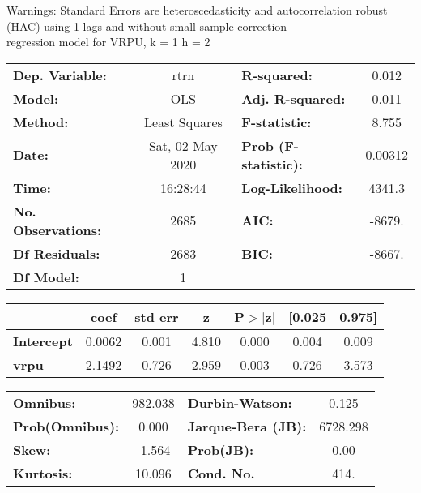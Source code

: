 Warnings: \newline
 [1] Standard Errors are heteroscedasticity and autocorrelation robust (HAC) using 1 lags and without small sample correction\\ 

regression model for VRPU, k = 1 h = 2\begin{center}
\begin{tabular}{lclc}
\toprule
\textbf{Dep. Variable:}    &       rtrn       & \textbf{  R-squared:         } &     0.012   \\
\textbf{Model:}            &       OLS        & \textbf{  Adj. R-squared:    } &     0.011   \\
\textbf{Method:}           &  Least Squares   & \textbf{  F-statistic:       } &     8.755   \\
\textbf{Date:}             & Sat, 02 May 2020 & \textbf{  Prob (F-statistic):} &  0.00312    \\
\textbf{Time:}             &     16:28:44     & \textbf{  Log-Likelihood:    } &    4341.3   \\
\textbf{No. Observations:} &        2685      & \textbf{  AIC:               } &    -8679.   \\
\textbf{Df Residuals:}     &        2683      & \textbf{  BIC:               } &    -8667.   \\
\textbf{Df Model:}         &           1      & \textbf{                     } &             \\
\bottomrule
\end{tabular}
\begin{tabular}{lcccccc}
                   & \textbf{coef} & \textbf{std err} & \textbf{z} & \textbf{P$> |$z$|$} & \textbf{[0.025} & \textbf{0.975]}  \\
\midrule
\textbf{Intercept} &       0.0062  &        0.001     &     4.810  &         0.000        &        0.004    &        0.009     \\
\textbf{vrpu}      &       2.1492  &        0.726     &     2.959  &         0.003        &        0.726    &        3.573     \\
\bottomrule
\end{tabular}
\begin{tabular}{lclc}
\textbf{Omnibus:}       & 982.038 & \textbf{  Durbin-Watson:     } &    0.125  \\
\textbf{Prob(Omnibus):} &   0.000 & \textbf{  Jarque-Bera (JB):  } & 6728.298  \\
\textbf{Skew:}          &  -1.564 & \textbf{  Prob(JB):          } &     0.00  \\
\textbf{Kurtosis:}      &  10.096 & \textbf{  Cond. No.          } &     414.  \\
\bottomrule
\end{tabular}
\end{center}

